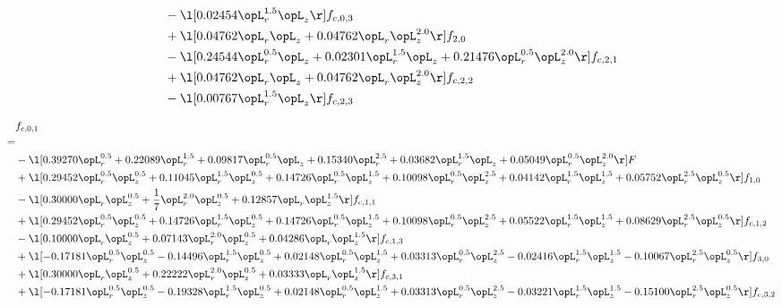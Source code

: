 \begin{alignat}{2}
& - \l[  0.02454 \opL_r^{1.5} \opL_z  \r] f_{c,0,3} \nonumber \\ 
& + \l[  0.04762 \opL_r \opL_z +  0.04762 \opL_r \opL_z^{2.0}  \r] f_{2,0} \nonumber \\ 
& - \l[  0.24544 \opL_r^{0.5} \opL_z +  0.02301 \opL_r^{1.5} \opL_z +  0.21476 \opL_r^{0.5} \opL_z^{2.0}  \r] f_{c,2,1} \nonumber \\ 
& + \l[  0.04762 \opL_r \opL_z +  0.04762 \opL_r \opL_z^{2.0}  \r] f_{c,2,2} \nonumber \\ 
& - \l[  0.00767 \opL_r^{1.5} \opL_z  \r] f_{c,2,3} \nonumber \\ 
\end{alignat} 


\begin{alignat}{2} 
\label{eq:f_01_1} 
& f_{c,0,1} \nonumber \\ 
 = \\ 
& - \l[  0.39270 \opL_r^{0.5} +  0.22089 \opL_r^{1.5} +  0.09817 \opL_r^{0.5} \opL_z +  0.15340 \opL_r^{2.5} +  0.03682 \opL_r^{1.5} \opL_z +  0.05049 \opL_r^{0.5} \opL_z^{2.0}  \r] F \nonumber \\ 
& + \l[  0.29452 \opL_r^{0.5} \opL_z^{0.5} +  0.11045 \opL_r^{1.5} \opL_z^{0.5} +  0.14726 \opL_r^{0.5} \opL_z^{1.5} +  0.10098 \opL_r^{0.5} \opL_z^{2.5} +  0.04142 \opL_r^{1.5} \opL_z^{1.5} +  0.05752 \opL_r^{2.5} \opL_z^{0.5}  \r] f_{1,0} \nonumber \\ 
& - \l[  0.30000 \opL_r \opL_z^{0.5} + \frac{1}{7} \opL_r^{2.0} \opL_z^{0.5} +  0.12857 \opL_r \opL_z^{1.5}  \r] f_{c,1,1} \nonumber \\ 
& + \l[  0.29452 \opL_r^{0.5} \opL_z^{0.5} +  0.14726 \opL_r^{1.5} \opL_z^{0.5} +  0.14726 \opL_r^{0.5} \opL_z^{1.5} +  0.10098 \opL_r^{0.5} \opL_z^{2.5} +  0.05522 \opL_r^{1.5} \opL_z^{1.5} +  0.08629 \opL_r^{2.5} \opL_z^{0.5}  \r] f_{c,1,2} \nonumber \\ 
& - \l[  0.10000 \opL_r \opL_z^{0.5} +  0.07143 \opL_r^{2.0} \opL_z^{0.5} +  0.04286 \opL_r \opL_z^{1.5}  \r] f_{c,1,3} \nonumber \\ 
& + \l[  -0.17181 \opL_r^{0.5} \opL_z^{0.5}   -0.14496 \opL_r^{1.5} \opL_z^{0.5} +  0.02148 \opL_r^{0.5} \opL_z^{1.5} +  0.03313 \opL_r^{0.5} \opL_z^{2.5}   -0.02416 \opL_r^{1.5} \opL_z^{1.5}   -0.10067 \opL_r^{2.5} \opL_z^{0.5}  \r] f_{3,0} \nonumber \\ 
& + \l[  0.30000 \opL_r \opL_z^{0.5} +  0.22222 \opL_r^{2.0} \opL_z^{0.5} +  0.03333 \opL_r \opL_z^{1.5}  \r] f_{c,3,1} \nonumber \\ 
& + \l[  -0.17181 \opL_r^{0.5} \opL_z^{0.5}   -0.19328 \opL_r^{1.5} \opL_z^{0.5} +  0.02148 \opL_r^{0.5} \opL_z^{1.5} +  0.03313 \opL_r^{0.5} \opL_z^{2.5}   -0.03221 \opL_r^{1.5} \opL_z^{1.5}   -0.15100 \opL_r^{2.5} \opL_z^{0.5}  \r] f_{c,3,2} \nonumber \\ 

\end{alignat}
